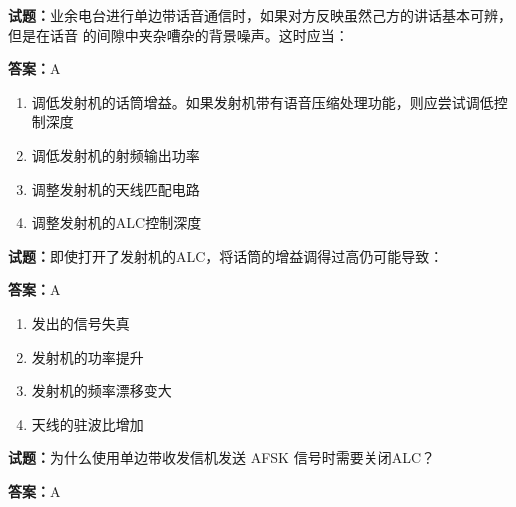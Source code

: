 \documentclass{ctexbook}
\begin{document}




\vspace{1em}

\textbf{试题：}业余电台进行单边带话音通信时，如果对方反映虽然己方的讲话基本可辨，但是在话音
的间隙中夹杂嘈杂的背景噪声。这时应当： 

\textbf{答案：}A 

\begin{enumerate}[leftmargin=3em]
  \item 调低发射机的话筒增益。如果发射机带有语音压缩处理功能，则应尝试调低控制深度 

  \item 调低发射机的射频输出功率 

  \item 调整发射机的天线匹配电路 

  \item 调整发射机的ALC控制深度 

\end{enumerate}





\vspace{1em}

\textbf{试题：}即使打开了发射机的ALC，将话筒的增益调得过高仍可能导致： 

\textbf{答案：}A 

\begin{enumerate}[leftmargin=3em]
  \item 发出的信号失真 

  \item 发射机的功率提升 

  \item 发射机的频率漂移变大 

  \item 天线的驻波比增加 

\end{enumerate}





\vspace{1em}

\textbf{试题：}为什么使用单边带收发信机发送 AFSK 信号时需要关闭ALC？ 

\textbf{答案：}A 
\end{document}
